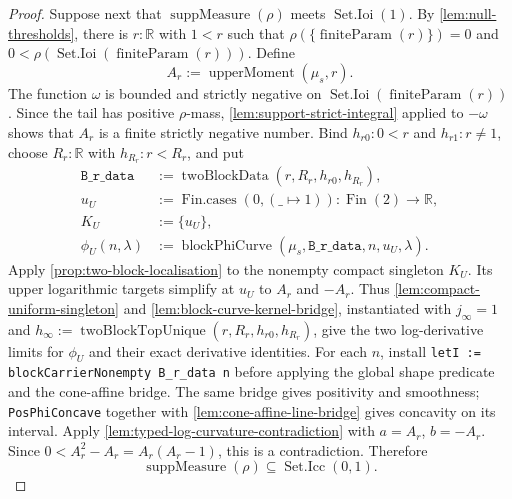 \documentclass[9pt]{extarticle}
\theoremstyle{definition}
\theoremstyle{remark}
\newcommand{\R}{\mathbb R}
\begin{document}
\begin{proof}
Suppose next that $\operatorname{suppMeasure}(\rho)$ meets
$\operatorname{Set.Ioi}(1)$. By
\cref{lem:null-thresholds}, there is $r:\R$ with $1<r$ such that
$\rho(\{\operatorname{finiteParam}(r)\})=0$ and
$0<\rho(\operatorname{Set.Ioi}(\operatorname{finiteParam}(r)))$. Define
\[
 A_r:=\operatorname{upperMoment}(\mu_s,r).
\]
The function $\omega$ is bounded and strictly negative on
$\operatorname{Set.Ioi}(\operatorname{finiteParam}(r))$.  Since the tail
has positive $\rho$-mass,
\cref{lem:support-strict-integral} applied to $-\omega$ shows that $A_r$ is
a finite strictly negative number.  Bind
$h_{r0}:0<r$ and $h_{r1}:r\neq1$, choose $R_r:\R$ with
$h_{R_r}:r<R_r$, and put
\begin{align*}
 \texttt{B\_r\_data}&:=\operatorname{twoBlockData}(r,R_r,h_{r0},h_{R_r}),\\
 u_U&:=\operatorname{Fin.cases}(0,(\_\mapsto1)):
       \operatorname{Fin}(2)\to\R,\\
 K_U&:=\{u_U\},\\
 \phi_U(n,\lambda)&:=
  \operatorname{blockPhiCurve}(\mu_s,\texttt{B\_r\_data},n,u_U,\lambda).
\end{align*}
Apply \cref{prop:two-block-localisation} to the nonempty compact singleton
$K_U$.  Its upper logarithmic targets simplify at $u_U$ to
$A_r$ and $-A_r$.  Thus \cref{lem:compact-uniform-singleton} and
\cref{lem:block-curve-kernel-bridge}, instantiated with $j_\infty=1$ and
$h_\infty:=\operatorname{twoBlockTopUnique}(r,R_r,h_{r0},h_{R_r})$, give
the two log-derivative limits for
$\phi_U$ and their exact derivative identities.  For each $n$, install
\texttt{letI := blockCarrierNonempty B\_r\_data n} before applying the
global shape predicate and the cone-affine bridge.  The same bridge gives
positivity and smoothness; \texttt{PosPhiConcave} together with
\cref{lem:cone-affine-line-bridge} gives concavity on its interval.  Apply
\cref{lem:typed-log-curvature-contradiction} with
$a=A_r$, $b=-A_r$.  Since
$0<A_r^2-A_r=A_r(A_r-1)$, this is a contradiction.  Therefore
\[
 \operatorname{suppMeasure}(\rho)
 \subseteq\operatorname{Set.Icc}(0,1).
\]


\end{proof}
\end{document}
